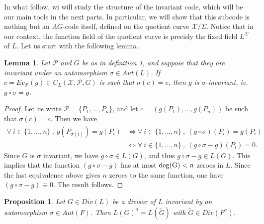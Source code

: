 \documentclass[10pt]{article}
\newtheorem{prop1}{Proposition}[]
\newtheorem{lem1}{Lemma}[]
\newcommand{\s}{\vspace{0.3cm}}
\newcommand{\X}{\mathcal{X}}
\newcommand{\PR}{\mathcal{P}}
\begin{document}
In what follow, wi will study the structure of the invariant code, which will be our main tools in the next parts. In particular, we will show that this subcode is nothing but an $AG$-code itself, defined on the quotient curve $\X/\Sigma$. Notice that in our context, the function field of the quotient curve is precisly the fixed field $L^{\Sigma}$ of $L$. Let us start with the following lemma.

\s

\begin{lem1} \label{inv}
Let $\PR$ and $G$ be as in definition 1, and suppose that they are invariant under an automorphism $\sigma \in Aut(L)$. If $c = Ev_{\PR}(g) \in C_L(\X,\PR,G)$ is such that $\sigma(c) = c$, then $g$ is $\sigma$-invariant, ie. $g\circ \sigma = g$. 
\end{lem1}

\s

\begin{proof}
Let us write $\PR = \{P_1,...,P_n\}$, and let $c=(g(P_1),...,g(P_n))$ be such that $\sigma(c)=c$. Then we have 
\begin{align*}
\forall \ i \in \{1,...,n\} \ , \ g(P_{\sigma(i)}) = g(P_i) &\iff \forall \ i \in \{1,...,n\} \ , \ (g \circ \sigma)(P_i) =g(P_i) \\
& \iff \forall \ i \in \{1,...,n\} \ , \ (g\circ \sigma - g)(P_i) = 0.
\end{align*}
Since $G$ is $\sigma$ invariant, we have $g \circ \sigma \in L(G)$, and thus $g\circ \sigma - g \in L(G)$. This implies that the function $(g \circ \sigma - g)$ has at most $\rm{deg}(G)<\it{n}$ zeroes in $L$. Since the last equivalence above gives $n$ zeroes to the same function, one have $(g \circ \sigma - g) \equiv 0$. The result follows.
\end{proof}

\s

\begin{prop1} \label{invrr}
Let $G \in Div(L)$ be a divisor of $L$ invariant by an automorphism $\sigma \in Aut(F)$. Then $L(G)^{\sigma} = L(\tilde{G})$ with $\tilde{G} \in Div(F^{\sigma})$.
\end{prop1}

\s
\end{document}
